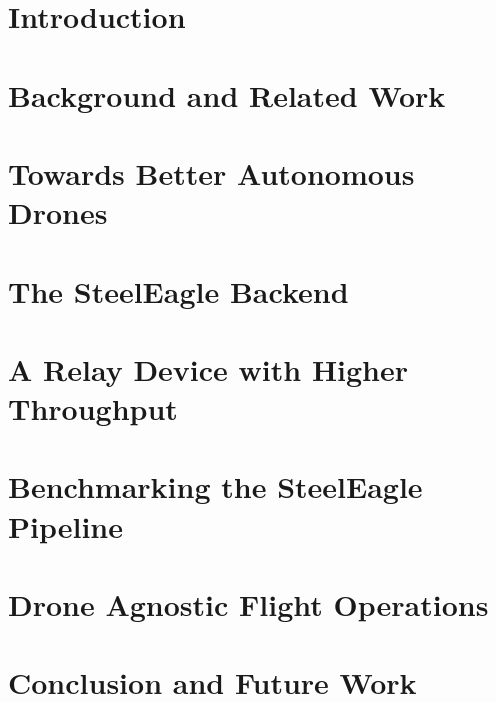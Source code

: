 \documentclass[12pt]{cmuthesis}
\begin{document}
\chapter{Introduction}

\chapter{Background and Related Work}

\chapter{Towards Better Autonomous Drones}

\chapter{The SteelEagle Backend}

\chapter{A Relay Device with Higher Throughput}

\chapter{Benchmarking the SteelEagle Pipeline}

\chapter{Drone Agnostic Flight Operations}

\chapter{Conclusion and Future Work}


%

\backmatter


\renewcommand{\bibsection}{\chapter{\bibname}}

\end{document}
